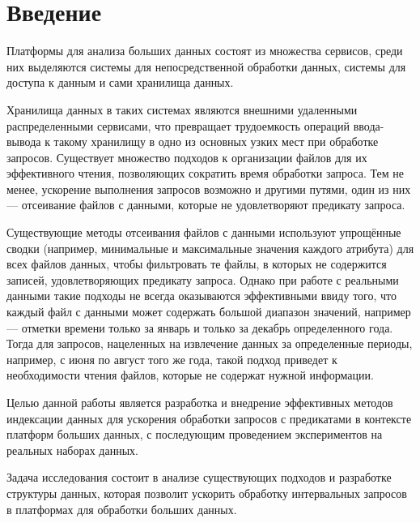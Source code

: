 \section*{Введение}

Платформы для анализа больших данных состоят из множества сервисов, среди них выделяются системы для непосредственной обработки данных, системы для доступа к данным и сами хранилища данных.

Хранилища данных в таких системах являются внешними удаленными распределенными сервисами, что превращает трудоемкость операций ввода-вывода к такому хранилищу в одно из основных узких мест при обработке запросов. Существует множество подходов к организации файлов для их эффективного чтения, позволяющих сократить время обработки запроса. Тем не менее, ускорение выполнения запросов возможно и другими путями, один из них --- отсеивание файлов с данными, которые не удовлетворяют предикату запроса.

Существующие методы отсеивания файлов с данными используют упрощённые сводки (например, минимальные и максимальные значения каждого атрибута) для всех файлов данных, чтобы фильтровать те файлы, в которых не содержится записей, удовлетворяющих предикату запроса. Однако при работе с реальными данными такие подходы не всегда оказываются эффективными ввиду того, что каждый файл с данными может содержать большой диапазон значений, например --- отметки времени только за январь и только за декабрь определенного года. Тогда для запросов, нацеленных на извлечение данных за определенные периоды, например, с июня по август того же года, такой подход приведет к необходимости чтения файлов, которые не содержат нужной информации.

Целью данной работы является разработка и внедрение эффективных методов индексации данных для ускорения обработки запросов с предикатами в контексте платформ больших данных, с последующим проведением экспериментов на реальных наборах данных.

Задача исследования состоит в анализе существующих подходов и разработке структуры данных, которая позволит ускорить обработку интервальных запросов в платформах для обработки больших данных.
